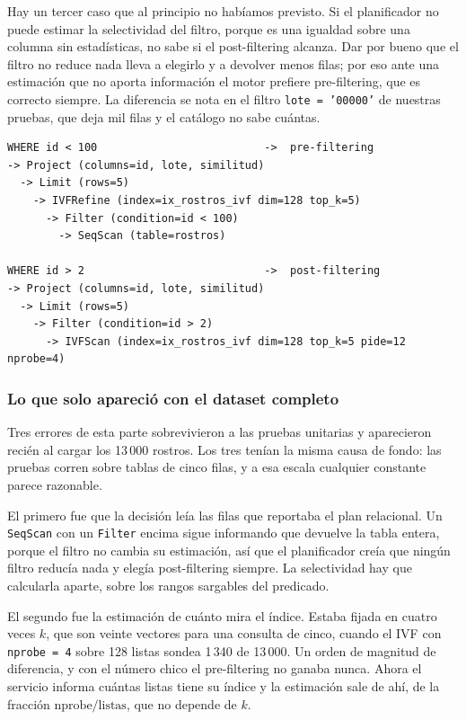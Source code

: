 Hay un tercer caso que al principio no habíamos previsto. Si el planificador no
puede estimar la selectividad del filtro, porque es una igualdad sobre una
columna sin estadísticas, no sabe si el post-filtering alcanza. Dar por bueno que
el filtro no reduce nada lleva a elegirlo y a devolver menos filas; por eso ante
una estimación que no aporta información el motor prefiere pre-filtering, que es
correcto siempre. La diferencia se nota en el filtro \texttt{lote = '00000'} de
nuestras pruebas, que deja mil filas y el catálogo no sabe cuántas.

\begin{lstlisting}[caption={Los dos planes para la misma foto de consulta}]
WHERE id < 100                          ->  pre-filtering
-> Project (columns=id, lote, similitud)
  -> Limit (rows=5)
    -> IVFRefine (index=ix_rostros_ivf dim=128 top_k=5)
      -> Filter (condition=id < 100)
        -> SeqScan (table=rostros)

WHERE id > 2                            ->  post-filtering
-> Project (columns=id, lote, similitud)
  -> Limit (rows=5)
    -> Filter (condition=id > 2)
      -> IVFScan (index=ix_rostros_ivf dim=128 top_k=5 pide=12 nprobe=4)
\end{lstlisting}

\subsubsection{Lo que solo apareció con el dataset completo}

Tres errores de esta parte sobrevivieron a las pruebas unitarias y aparecieron
recién al cargar los 13\,000 rostros. Los tres tenían la misma causa de fondo:
las pruebas corren sobre tablas de cinco filas, y a esa escala cualquier
constante parece razonable.

El primero fue que la decisión leía las filas que reportaba el plan relacional.
Un \texttt{SeqScan} con un \texttt{Filter} encima sigue informando que devuelve
la tabla entera, porque el filtro no cambia su estimación, así que el
planificador creía que ningún filtro reducía nada y elegía post-filtering
siempre. La selectividad hay que calcularla aparte, sobre los rangos sargables
del predicado.

El segundo fue la estimación de cuánto mira el índice. Estaba fijada en cuatro
veces $k$, que son veinte vectores para una consulta de cinco, cuando el IVF con
\texttt{nprobe = 4} sobre 128 listas sondea 1\,340 de 13\,000. Un orden de
magnitud de diferencia, y con el número chico el pre-filtering no ganaba nunca.
Ahora el servicio informa cuántas listas tiene su índice y la estimación sale de
ahí, de la fracción $\text{nprobe}/\text{listas}$, que no depende de $k$.

